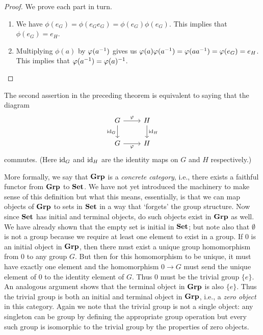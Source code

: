 \begin{proof}
    We prove each part in turn.

    \begin{enumerate}[label=(\alph*), wide]
        \item We have \(\phi(e_G) = \phi(e_G e_G) = \phi(e_G) \phi(e_G)\). This
        implies that \(\phi(e_G) = e_H\).
        \item Multiplying \(\phi(a)\) by \(\varphi(a^{-1})\) gives us
        \(\varphi(a)\varphi(a^{-1}) = \varphi(aa^{-1}) = \varphi(e_G) = e_H\). This implies
        that \(\varphi(a^{-1}) = \varphi(a)^{-1}\).
    \end{enumerate}
\end{proof}

The second assertion in the preceding theorem is equivalent to saying that the
diagram
\[
    \begin{tikzcd}
        G \arrow{r}{\phi} \arrow[swap]{d}{\id_G} & H \arrow{d}{\id_H} \\
        G \arrow[swap]{r}{\phi} & H
    \end{tikzcd}
\]
commutes. (Here \(\operatorname{id}_G\) and \(\operatorname{id}_H\) are the identity maps on \(G\) and \(H\)
respectively.)

More formally, we say that \(\mathbf{Grp}\) is a \emph{concrete category}, i.e., there
exists a faithful functor from \(\mathbf{Grp}\) to \(\mathbf{Set}\). We have not yet introduced
the machinery to make sense of this definition but what this means, essentially,
is that we can map objects of \(\mathbf{Grp}\) to sets in \(\mathbf{Set}\) in a way that
`forgets' the group structure. Now since \(\mathbf{Set}\) has initial and terminal
objects, do such objects exist in \(\mathbf{Grp}\) as well. We have already shown that
the empty set is initial in \(\mathbf{Set}\); but note also that \(\emptyset\) is not a
group because we require at least one element to exist in a group. If \(0\) is
an initial object in \(\mathbf{Grp}\), then there must exist a unique group homomorphism
from \(0\) to any group \(G\). But then for this homomorphism to be unique, it
must have exactly one element and the homomorphism \(0 \to G\) must send the
unique element of \(0\) to the identity element of \(G\). Thus \(0\) must be the
trivial group \(\{e\}\). An analogous argument shows that the terminal object in
\(\mathbf{Grp}\) is also \(\{e\}\). Thus the trivial group is both an initial and
terminal object in \(\mathbf{Grp}\), i.e., a \emph{zero object} in this category. Again
we note that the trivial group is not a single object: any singleton can be
group by defining the appropriate group operation but every such group is
isomorphic to the trivial group by the properties of zero objects.

